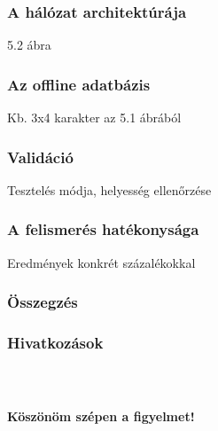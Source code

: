 \documentclass{beamer}
\begin{document}
\begin{frame}[fragile]
\frametitle{A hálózat architektúrája}

5.2 ábra

\end{frame}

\begin{frame}[fragile]
\frametitle{Az offline adatbázis}

Kb. 3x4 karakter az 5.1 ábrából

\end{frame}

\begin{frame}[fragile]
\frametitle{Validáció}

Tesztelés módja, helyesség ellenőrzése

\end{frame}

\begin{frame}[fragile]
\frametitle{A felismerés hatékonysága}

Eredmények konkrét százalékokkal

\end{frame}

\begin{frame}[fragile]
\frametitle{Összegzés}


\end{frame}


\begin{frame}[fragile]
\frametitle{Hivatkozások}


\end{frame}

\begin{frame}[fragile]
    \frametitle{\ }

\begin{center}
\Large \textbf{Köszönöm szépen a figyelmet!}
\end{center}

\end{frame}
\end{document}

